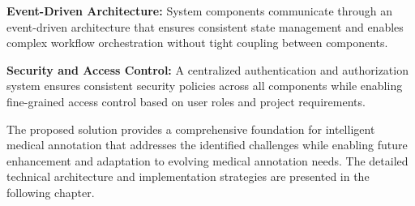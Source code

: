 \textbf{Event-Driven Architecture:} System components communicate through an event-driven architecture that ensures consistent state management and enables complex workflow orchestration without tight coupling between components.

\textbf{Security and Access Control:} A centralized authentication and authorization system ensures consistent security policies across all components while enabling fine-grained access control based on user roles and project requirements.

The proposed solution provides a comprehensive foundation for intelligent medical annotation that addresses the identified challenges while enabling future enhancement and adaptation to evolving medical annotation needs. The detailed technical architecture and implementation strategies are presented in the following chapter. 